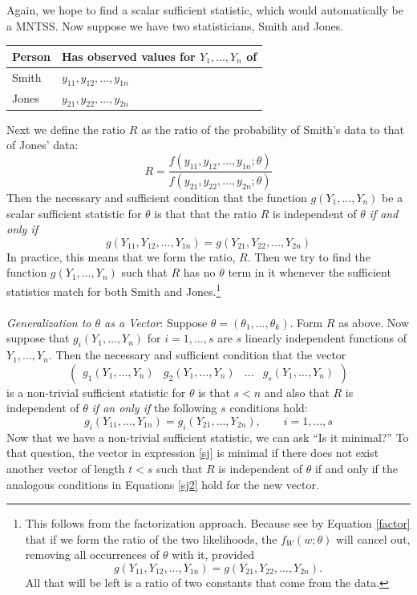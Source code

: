 \documentclass[a4paper,12pt]{scrartcl}
\begin{document}
Again, we hope to find a scalar sufficient statistic, which would
automatically be a MNTSS. Now suppose we have two statisticians,
Smith and Jones.
\begin{center}
\begin{tabular}{ l | l}
   Person & Has observed values for $Y_1, \ldots, Y_n$ of \\ \hline
   Smith & $y_{11}, y_{12}, \ldots, y_{1n}$ \\
   Jones & $y_{21}, y_{22}, \ldots, y_{2n}$
\end{tabular}
\end{center}
Next we define the ratio $R$ as the ratio of the probability of
Smith's data to that of Jones' data:
   \[ R = \frac{f(y_{11}, y_{12}, \ldots, y_{1n}; \theta)}{ f(
      y_{21}, y_{22}, \ldots, y_{2n}; \theta)}\]
Then the necessary and sufficient condition that the function
$g(Y_1, \ldots, Y_n)$ be a scalar sufficient statistic for $\theta$
is that that the ratio $R$ is independent of $\theta$
\emph{if and only if}
   \[ g(Y_{11}, Y_{12}, \ldots, Y_{1n})
      =  g(Y_{21}, Y_{22}, \ldots, Y_{2n}) \]
In practice, this means that we form the ratio, $R$. Then we try to
find the function $g(Y_1,\ldots, Y_n)$ such that $R$ has no
$\theta$ term in it whenever the sufficient statistics match for
both Smith and Jones.\footnote{
This follows from the factorization
approach. Because see by Equation \ref{factor} that if we form
the ratio of the two likelihoods, the $f_W(w;\theta)$ will cancel
out, removing all occurrences of $\theta$ with it, provided
   \[ g(Y_{11}, Y_{12}, \ldots, Y_{1n})
      =  g(Y_{21}, Y_{22}, \ldots, Y_{2n}). \]
All that will be left is a ratio of two constants that come from
the data.}
\\
\\
{\sl Generalization to $\theta$ as a Vector}: Suppose
$\theta = (\theta_1, \ldots, \theta_k)$. Form $R$ as above.
Now suppose that $g_i(Y_1,  \ldots, Y_n)$ for $i=1, \ldots, s$
are $s$ linearly independent functions of $Y_1, \ldots, Y_n$.
Then the necessary and sufficient condition that the vector
\begin{equation}
\label{sj}
 \begin{pmatrix} g_1(Y_1, \ldots, Y_n) & g_2(Y_1, \ldots, Y_n) & \ldots
      & g_s(Y_1, \ldots, Y_n) \end{pmatrix}
\end{equation}
is a non-trivial sufficient statistic for $\theta$ is that $s<n$
and also that $R$ is independent of $\theta$ \emph{if an only if}
the following $s$ conditions hold:
\begin{equation}
   \label{sj2}
   g_i(Y_{11}, \ldots, Y_{1n}) =  g_i(Y_{21}, \ldots, Y_{2n}),
      \qquad i = 1, \ldots,s
\end{equation}
Now that we have a non-trivial sufficient statistic, we can ask ``Is
it minimal?'' To that question, the vector in expression \ref{sj} is
minimal if there does not exist another vector of length $t<s$
such that $R$ is independent of $\theta$ if and only if the
analogous conditions in Equations \ref{sj2} hold for the new vector.
\end{document}

